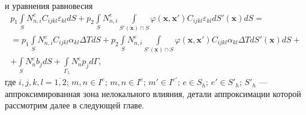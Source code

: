 и уравнения равновесия
\begin{multline}
	\label{eq:StressIntegrateIndices}
	p_1 \int\limits_S N_{n,i}^{e} C_{ijkl} \varepsilon_{kl} dS
	+
	p_2 \int\limits_S N_{n, i}^{e} \int\limits_{S'(\boldsymbol{x}) \cap S}
	\varphi(\boldsymbol{x}, \boldsymbol{x}') C_{ijkl} \varepsilon_{kl} dS'(\boldsymbol{x}) dS
	= \\ =
	p_1 \int\limits_S N_{n,i}^{e} C_{ijkl} \alpha_{kl} \Delta T dS +
	p_2 \int\limits_S N_{n,i}^{e}
	\int\limits_{S'(\boldsymbol{x}) \cap S} 
	\varphi(\boldsymbol{x}, \boldsymbol{x}')
	C_{ijkl} \alpha_{kl} \Delta T dS'(\boldsymbol{x}) dS 
	+ \\ +
	\int\limits_S N_n^{e} b_j dS +
	\int\limits_{\Gamma_5} N_n^{e} p_j d\Gamma,
\end{multline}
где $i,j,k,l = \overline{1, 2}$; $m, n \in I^e$; $m, n \in I^e$; $m' \in I^{e'}$; $e \in S_h$; $e' \in S'_h$; $S'_h$ --- аппроксимированная зона нелокального влияния, детали аппроксимации которой рассмотрим далее в следующей главе.

